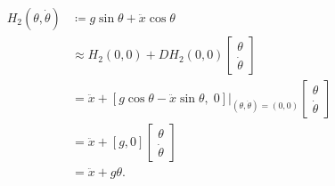 \begin{align*}
H_2(\theta, \dot \theta) &\coloneq g \sin \theta + \ddot x \cos \theta\\
&\approx H_2(0, 0) + DH_2(0, 0)
    \begin{bmatrix}
        \theta\\
        \dot \theta
    \end{bmatrix}\\
&= \ddot x + \left[g \cos \theta - \ddot x \sin \theta, \; 0\right]
\bigg|_{(\theta, \dot \theta) = (0, 0)}
    \begin{bmatrix}
        \theta\\
        \dot \theta
    \end{bmatrix}\\
&= \ddot x + \left[g, 0\right]
    \begin{bmatrix}
        \theta\\
        \dot \theta
    \end{bmatrix}\\
&= \ddot x + g \theta.
\end{align*}